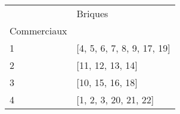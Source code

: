 \documentclass[preview]{standalone}
\begin{document}
    \begin{tabular}{ll}
\toprule
 & Briques \\
Commerciaux &  \\
\midrule
1 & [4, 5, 6, 7, 8, 9, 17, 19] \\
2 & [11, 12, 13, 14] \\
3 & [10, 15, 16, 18] \\
4 & [1, 2, 3, 20, 21, 22] \\
\bottomrule
\end{tabular}

    
\end{document}
